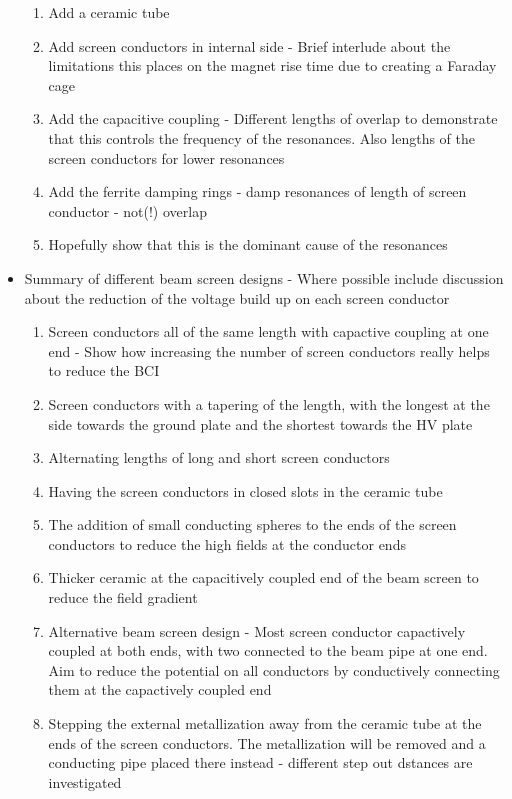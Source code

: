 \begin{itemize}
\begin{enumerate}
\item{Add a ceramic tube}
\item{Add screen conductors in internal side - Brief interlude about the limitations this places on the magnet rise time due to creating a Faraday cage}
\item{Add the capacitive coupling - Different lengths of overlap to demonstrate that this controls the frequency of the resonances. Also lengths of the screen conductors for lower resonances}
\item{Add the ferrite damping rings - damp resonances of length of screen conductor - not(!) overlap}
\item{Hopefully show that this is the dominant cause of the resonances}
\end{enumerate}
\item{Summary of different beam screen designs - Where possible include discussion about the reduction of the voltage build up on each screen conductor}
\begin{enumerate}
\item{Screen conductors all of the same length with capactive coupling at one end - Show how increasing the number of screen conductors really helps to reduce the BCI}
\item{Screen conductors with a tapering of the length, with the longest at the side towards the ground plate and the shortest towards the HV plate}
\item{Alternating lengths of long and short screen conductors}
\item{Having the screen conductors in closed slots in the ceramic tube}
\item{The addition of small conducting spheres to the ends of the screen conductors to reduce the high fields at the conductor ends}
\item{Thicker ceramic at the capacitively coupled end of the beam screen to reduce the field gradient}
\item{Alternative beam screen design - Most screen conductor capactively coupled at both ends, with two connected to the beam pipe at one end. Aim to reduce the potential on all conductors by conductively connecting them at the capactively coupled end}
\item{Stepping the external metallization away from the ceramic tube at the ends of the screen conductors. The metallization will be removed and a conducting pipe placed there instead - different step out dstances are investigated}
\end{enumerate}


\end{itemize}
